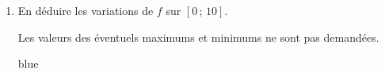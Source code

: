 \begin{enumerate}
\begin{color}{blue}
		 
				
		\end{color}
		
		\item En déduire les variations de $f$ sur $[0\,;\,10]$.
		
		Les valeurs des éventuels maximums et minimums ne sont pas demandées.
		
		\begin{color}{blue}
		\begin{center}
		\end{center}
		\end{color}
		
	\end{enumerate}
